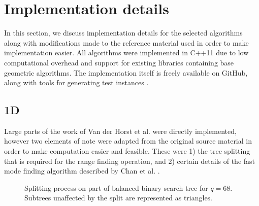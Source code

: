 \documentclass{article}
\begin{document}
\section{Implementation details}
In this section, we discuss implementation details for the selected algorithms
along with modifications made to the reference material used in order to make
implementation easier. All algorithms were implemented in C++11 due to low
computational overhead and support for existing libraries containing base
geometric algorithms. The implementation itself is freely available on GitHub,
along with tools for generating test instances \cite{vanderPlasImplementation}.
\subsection{1D}
Large parts of the work of Van der Horst et al.
\cite{vanderhorst_et_al:LIPIcs.ESA.2022.67} were directly implemented, however
two elements of note were adapted from the original source material in order to
make computation easier and feasible. These were 1) the tree splitting that is
required for the range finding operation, and 2) certain details of the fast
mode finding algorithm described by Chan et al. \cite{Chan2014}.
\begin{figure}%
    \centering
    \qquad
    \caption{Splitting process on part of balanced binary search tree for $q=68$. Subtrees unaffected by the split are represented as triangles.}%
    \label{fig:example}%
\end{figure}
\end{document}
